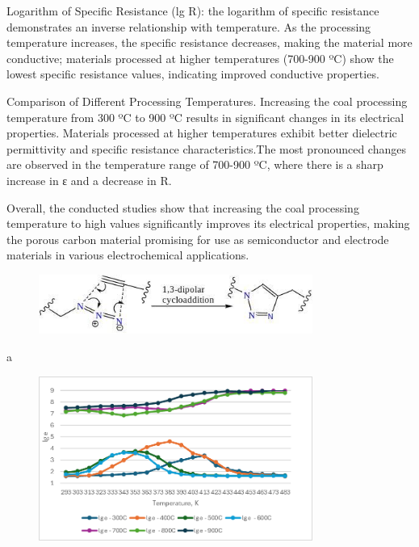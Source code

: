 Logarithm of Specific Resistance (lg R): the logarithm of specific
resistance demonstrates an inverse relationship with temperature. As the
processing temperature increases, the specific resistance decreases,
making the material more conductive; materials processed at higher
temperatures (700-900 ºC) show the lowest specific resistance values,
indicating improved conductive properties.

Comparison of Different Processing Temperatures. Increasing the coal
processing temperature from 300 ºC to 900 ºC results in significant
changes in its electrical properties. Materials processed at higher
temperatures exhibit better dielectric permittivity and specific
resistance characteristics.The most pronounced changes are observed in
the temperature range of 700-900 ºC, where there is a sharp increase in
ε and a decrease in R.

Overall, the conducted studies show that increasing the coal processing
temperature to high values significantly improves its electrical
properties, making the porous carbon material promising for use as
semiconductor and electrode materials in various electrochemical
applications.

\begin{figure}[H]
	\centering
	\includegraphics[width=0.8\textwidth]{assets/1012}
	\caption*{}
\end{figure}

a

\begin{figure}[H]
	\centering
	\includegraphics[width=0.8\textwidth]{assets/1074}
	\caption*{}
\end{figure}

